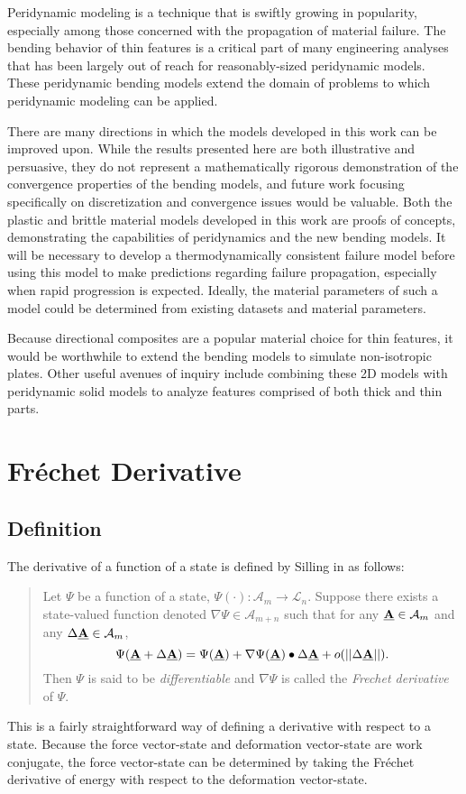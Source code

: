 Peridynamic modeling is a technique that is swiftly growing in popularity, especially among those concerned with the propagation of material failure.
The bending behavior of thin features is a critical part of many engineering analyses that has been largely out of reach for reasonably-sized peridynamic models. 
These peridynamic bending models extend the domain of problems to which peridynamic modeling can be applied. 

There are many directions in which the models developed in this work can be improved upon.
While the results presented here are both illustrative and persuasive, they do not represent a mathematically rigorous demonstration of the convergence properties of the bending models, and future work focusing specifically on discretization and convergence issues would be valuable.
Both the plastic and brittle material models developed in this work are proofs of concepts, demonstrating the capabilities of peridynamics and the new bending models.
It will be necessary to develop a thermodynamically consistent failure model before using this model to make predictions regarding failure propagation, especially when rapid progression is expected.
Ideally, the material parameters of such a model could be determined from existing datasets and material parameters.

Because directional composites are a popular material choice for thin features, it would be worthwhile to extend the bending models to simulate non-isotropic plates. Other useful avenues of inquiry include combining these 2D models with peridynamic solid models to analyze features comprised of both thick and thin parts.

\appendix
\chapter{Fr\'echet Derivative}
\label{sec:frechet}
\section{Definition}
The derivative of a function of a state is defined by Silling in \cite{silling2007peridynamic} as follows:
\begin{quote}
Let $\Psi$ be a function of a state, $\Psi(\cdot):\mathcal{A}_m\rightarrow\mathcal{L}_n$. Suppose there exists a state-valued function denoted $\nabla\Psi\in\mathcal{A}_{m+n}$ such that for any $\vstate{A}{}{}\in\mathcal{A}_m$ and any $\Delta\vstate{A}{}{}\in\mathcal{A}_m$,
\begin{equation}
  \Psi(\vstate{A}{}{}+\Delta\vstate{A}{}{})=\Psi(\vstate{A}{}{})+\nabla\Psi(\vstate{A}{}{})\bullet\Delta\vstate{A}{}{}+o(||\Delta\vstate{A}{}{}||).
\end{equation}
Then $\Psi$ is said to be \textit{differentiable} and $\nabla\Psi$ is called the \textit{Frechet derivative} of $\Psi$.
\end{quote}
This is a fairly straightforward way of defining a derivative with respect to a state.
Because the force vector-state and deformation vector-state are work conjugate, the force vector-state can be determined by taking the Fr\'echet derivative of energy with respect to the deformation vector-state.
